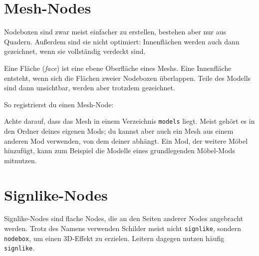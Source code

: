 \section{Mesh-Nodes}\label{mesh-nodes}

Nodeboxen sind zwar meist einfacher zu erstellen, bestehen aber nur aus
Quadern. Außerdem sind sie nicht optimiert: Innenflächen werden auch
dann gezeichnet, wenn sie vollständig verdeckt sind.

Eine Fläche (\emph{face}) ist eine ebene Oberfläche eines Meshs. Eine
Innenfläche entsteht, wenn sich die Flächen zweier Nodeboxen überlappen.
Teile des Modells sind dann unsichtbar, werden aber trotzdem gezeichnet.

So registrierst du einen Mesh-Node:

\begin{Shaded}
\begin{Highlighting}[]
\OperatorTok{(}\OperatorTok{,} \OperatorTok{\{}
     \OperatorTok{=} \OperatorTok{,}

     \OperatorTok{=} \OperatorTok{\{}
        \OperatorTok{,}
    \OperatorTok{\},}

     \OperatorTok{=} \OperatorTok{,}
\OperatorTok{\})}
\end{Highlighting}
\end{Shaded}

Achte darauf, dass das Mesh in einem Verzeichnis
\texttt{models} liegt. Meist gehört es in den Ordner deines eigenen
Mods; du kannst aber auch ein Mesh aus einem anderen Mod verwenden, von
dem deiner abhängt. Ein Mod, der weitere Möbel hinzufügt, kann zum
Beispiel die Modelle eines grundlegenden Möbel-Mods mitnutzen.

\section{Signlike-Nodes}\label{signlike-nodes}

Signlike-Nodes sind flache Nodes, die an den Seiten anderer Nodes
angebracht werden. Trotz des Namens verwenden Schilder meist nicht
\texttt{signlike}, sondern \texttt{nodebox}, um einen 3D-Effekt zu
erzielen. Leitern dagegen nutzen häufig \texttt{signlike}.

